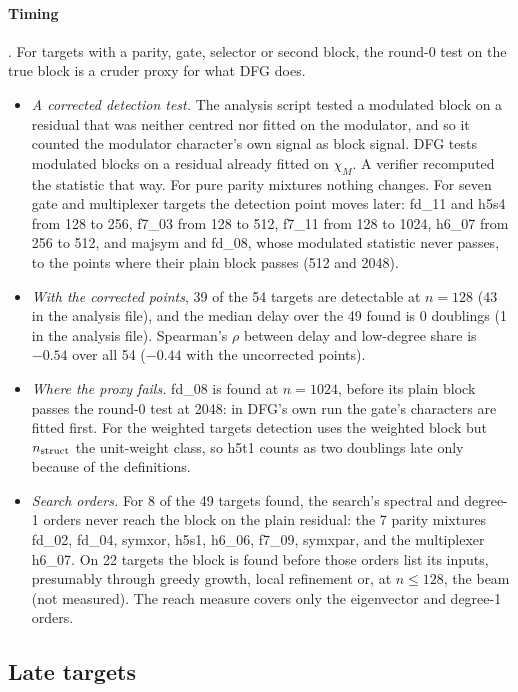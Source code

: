 \paragraph{Timing} . For targets with a parity, gate, selector or second block, the round-0 test on the true block is a cruder proxy for what DFG does.
\begin{itemize}
\item \emph{A corrected detection test.} The analysis script tested a modulated block on a residual that was neither centred nor fitted on the modulator, and so it counted the modulator character's own signal as block signal. DFG tests modulated blocks on a residual already fitted on $\chi_M$. A verifier recomputed the statistic that way. For pure parity mixtures nothing changes. For seven gate and multiplexer targets the detection point moves later: fd\_11 and h5s4 from 128 to 256, f7\_03 from 128 to 512, f7\_11 from 128 to 1024, h6\_07 from 256 to 512, and majsym and fd\_08, whose modulated statistic never passes, to the points where their plain block passes (512 and 2048).
\item \emph{With the corrected points}, 39 of the 54 targets are detectable at $n=128$ (43 in the analysis file), and the median delay over the 49 found is 0 doublings (1 in the analysis file). Spearman's $\rho$ between delay and low-degree share is $-0.54$ over all 54 ($-0.44$ with the uncorrected points).
\item \emph{Where the proxy fails.} fd\_08 is found at $n=1024$, before its plain block passes the round-0 test at 2048: in DFG's own run the gate's characters are fitted first. For the weighted targets detection uses the weighted block but $n_{\rm struct}$ the unit-weight class, so h5t1 counts as two doublings late only because of the definitions.
\item \emph{Search orders.} For 8 of the 49 targets found, the search's spectral and degree-1 orders never reach the block on the plain residual: the 7 parity mixtures fd\_02, fd\_04, symxor, h5s1, h6\_06, f7\_09, symxpar, and the multiplexer h6\_07. On 22 targets the block is found before those orders list its inputs, presumably through greedy growth, local refinement or, at $n\le128$, the beam (not measured). The reach measure covers only the eigenvector and degree-1 orders.
\end{itemize}

\subsection{Late targets}\label{app:interp-late}

